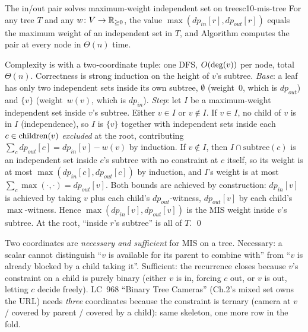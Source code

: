 \begin{theorem}{The in/out pair solves maximum-weight independent set on trees}{c10-mis-tree}
For any tree $T$ and any $w\colon V\to\mathbb{R}_{\ge 0}$, the value
$\max(\mathit{dp}_{\mathit{in}}[r],\mathit{dp}_{\mathit{out}}[r])$ equals the
maximum weight of an independent set in $T$, and Algorithm
 computes the pair at every node in $\Theta(n)$ time.
\end{theorem}
\begin{proofbox}
Complexity is  with a two-coordinate tuple:
one DFS, $O(\deg(v))$ per node, total $\Theta(n)$. Correctness is
strong induction on the height of $v$'s subtree. \emph{Base}: a leaf has
only two independent sets inside its own subtree, $\emptyset$ (weight~$0$,
which is $\mathit{dp}_{\mathit{out}}$) and $\{v\}$ (weight~$w(v)$, which
is $\mathit{dp}_{\mathit{in}}$). \emph{Step}: let $I$ be a maximum-weight
independent set inside $v$'s subtree. Either $v\in I$ or $v\notin I$.
If $v\in I$, no child of $v$ is in $I$ (independence), so $I$ is $\{v\}$
together with independent sets inside each $c\in\operatorname{children}(v)$ \emph{excluded}
at the root, contributing $\sum_c\mathit{dp}_{\mathit{out}}[c]=\mathit{dp}_{\mathit{in}}[v]-w(v)$
by induction. If $v\notin I$, then $I\cap\text{subtree}(c)$ is an independent
set inside $c$'s subtree with no constraint at $c$ itself, so its weight is
at most $\max(\mathit{dp}_{\mathit{in}}[c],\mathit{dp}_{\mathit{out}}[c])$
by induction, and $I$'s weight is at most $\sum_c\max(\cdot,\cdot)=
\mathit{dp}_{\mathit{out}}[v]$. Both bounds are achieved by construction:
$\mathit{dp}_{\mathit{in}}[v]$ is achieved by taking $v$ plus each child's
$\mathit{dp}_{\mathit{out}}$-witness, $\mathit{dp}_{\mathit{out}}[v]$ by
each child's $\max$-witness. Hence
$\max(\mathit{dp}_{\mathit{in}}[v],\mathit{dp}_{\mathit{out}}[v])$ is the
MIS weight inside $v$'s subtree. At the root, ``inside $r$'s subtree'' is
all of $T$. \qed
\end{proofbox}

\begin{insightbox}
Two coordinates are \emph{necessary and sufficient} for MIS on a tree.
Necessary: a scalar cannot distinguish ``$v$ is available for its parent
to combine with'' from ``$v$ is already blocked by a child taking it''.
Sufficient: the recurrence closes because $v$'s constraint on a child is
purely binary (either $v$ is in, forcing $c$ out, or $v$ is out, letting
$c$ decide freely). LC~968 ``Binary Tree Cameras'' (Ch.2's mixed set owns
the URL) needs \emph{three} coordinates because the constraint is ternary
(camera at $v$ / covered by parent / covered by a child): same skeleton,
one more row in the fold.
\end{insightbox}

